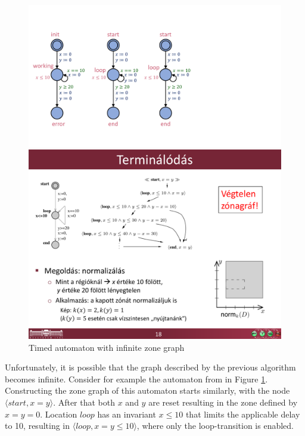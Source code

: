 \begin{figure} [b]
	\centering
	\begin{minipage}[c] {0.25\linewidth}%
		\includegraphics [width=\textwidth]{include/figures/loop_example_original}%
	\end{minipage}%
	\begin{minipage}[c] {0.7\linewidth}%
		\includegraphics [width=\textwidth] {include/figures/loop_original_zonegraph}%
	\end{minipage}
	\caption{Timed automaton with infinite zone graph}
	\label{fig:loopinfinite}
\end{figure} 

Unfortunately, it is possible that the graph described by the previous algorithm becomes infinite. Consider for example the automaton from \cite{bengtsson2004timed} in Figure \ref{fig:loopinfinite}.
Constructing the zone graph of this automaton starts similarly, with the node $\langle start, x=y \rangle$. After that both $x$ and $y$ are reset resulting in the zone defined by $x=y=0$. Location $loop$ has an invariant $x \leq 10$ that limits the applicable delay to 10, resulting in $\langle loop, x=y \leq 10 \rangle$, where only the loop-transition is enabled.

